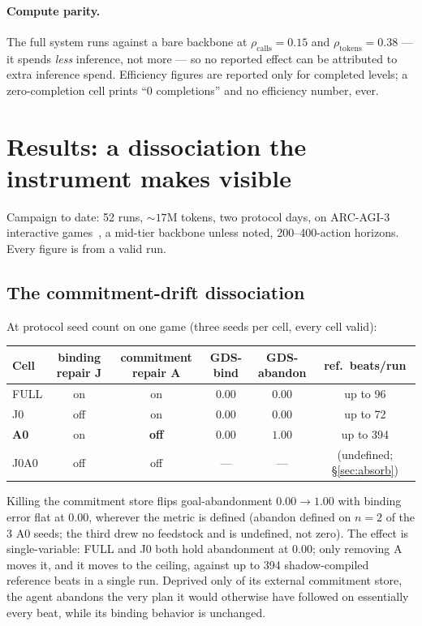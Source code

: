 \documentclass{article}
\begin{document}
\paragraph{Compute parity.} The full system runs against a bare backbone at
$\rho_{\text{calls}}=0.15$ and $\rho_{\text{tokens}}=0.38$ --- it spends
\emph{less} inference, not more --- so no reported effect can be attributed to
extra inference spend. Efficiency figures are reported only for completed levels;
a zero-completion cell prints ``0 completions'' and no efficiency number, ever.

\section{Results: a dissociation the instrument makes visible}
\label{sec:results}

Campaign to date: 52 runs, ${\sim}17$M tokens, two protocol days, on ARC-AGI-3
interactive games~\citep{arcagi3_2026}, a mid-tier backbone unless noted,
200--400-action horizons. Every figure is from a valid run.

\subsection{The commitment-drift dissociation}

At protocol seed count on one game (three seeds per cell, every cell valid):

\begin{table}[h]
\centering
\begin{tabular}{lccccc}
\toprule
Cell & binding repair \textbf{J} & commitment repair \textbf{A} & GDS-bind & GDS-abandon & ref.\ beats/run \\
\midrule
FULL       & on  & on           & $0.00$ & $0.00$ & up to 96 \\
J0         & off & on           & $0.00$ & $0.00$ & up to 72 \\
\textbf{A0}& on  & \textbf{off} & $\mathbf{0.00}$ & $\mathbf{1.00}$ & up to 394 \\
J0A0       & off & off          & --- & --- & (undefined; \S\ref{sec:absorb}) \\
\bottomrule
\end{tabular}
\end{table}

\noindent Killing the commitment store flips goal-abandonment $0.00\!\to\!1.00$
with binding error flat at $0.00$, wherever the metric is defined (abandon defined
on $n{=}2$ of the 3 A0 seeds; the third drew no feedstock and is undefined, not
zero). The effect is single-variable: FULL and J0 both hold abandonment at $0.00$;
only removing A moves it, and it moves to the ceiling, against up to 394
shadow-compiled reference beats in a single run. Deprived only of its external
commitment store, the agent abandons the very plan it would otherwise have followed
on essentially every beat, while its binding behavior is unchanged.
\end{document}

